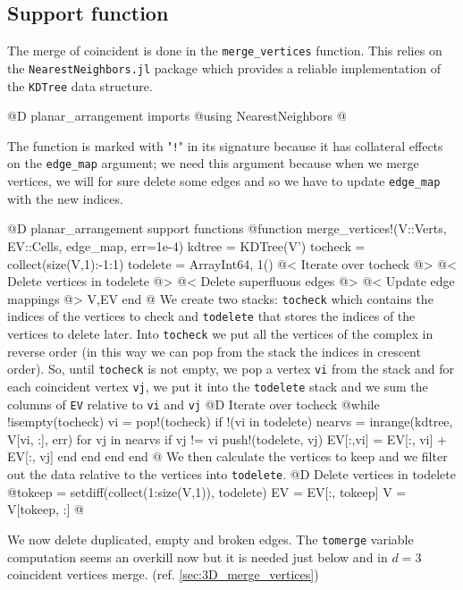 \subsection{Support function}
The merge of coincident is done in the \texttt{merge\_vertices}
function. This relies on the \texttt{NearestNeighbors.jl} package\cite{NearestNeighbors}
which provides a reliable implementation of the \texttt{KDTree} data structure.

@D planar\_arrangement imports
@{using NearestNeighbors
@}

The function is marked with "\texttt{!}" in its signature 
because it has collateral effects
on the \texttt{edge\_map} argument; we need this argument because when we
merge vertices, we will for sure delete some edges and so we have
to update \texttt{edge\_map} with the new indices.

@D planar\_arrangement support functions
@{function merge_vertices!(V::Verts, EV::Cells, edge_map, err=1e-4)
    kdtree = KDTree(V')
    tocheck = collect(size(V,1):-1:1)
    todelete = Array{Int64, 1}()
    @< Iterate over tocheck @>
    @< Delete vertices in todelete @>
    @< Delete superfluous edges @>
    @< Update edge mappings @>
    V,EV
end
@}
We create two stacks: \texttt{tocheck} which contains the indices of the vertices
to check and \texttt{todelete} that stores the indices of the vertices to delete later.
Into \texttt{tocheck} we put all the vertices of the complex in reverse order (in
this way we can pop from the stack the indices in crescent order). So, until \texttt{tocheck} is not empty,
we pop a vertex \texttt{vi} from the stack and for each coincident vertex \texttt{vj}, we put it 
into the \texttt{todelete} stack and we sum the columns of \texttt{EV} relative to \texttt{vi} and \texttt{vj}
@D Iterate over tocheck 
@{while !isempty(tocheck)
    vi = pop!(tocheck)
    if !(vi in todelete)
        nearvs = inrange(kdtree, V[vi, :], err)
        for vj in nearvs
            if vj != vi
                push!(todelete, vj)
                EV[:,vi] = EV[:, vi] + EV[:, vj]
            end
        end
    end
end
@}
We then calculate the vertices to keep and we filter out
the data relative to the vertices into \texttt{todelete}.
@D Delete vertices in todelete
@{tokeep = setdiff(collect(1:size(V,1)), todelete)
EV = EV[:, tokeep]
V = V[tokeep, :]
@}

We now delete duplicated, empty and broken edges.
The \texttt{tomerge} variable computation seems an overkill
now but it is needed just below and in $d=3$ coincident vertices merge.
(ref. \ref{sec:3D_merge_vertices})

